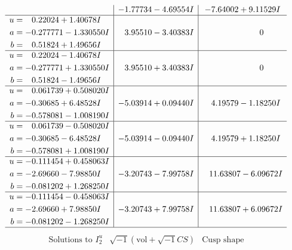 \documentclass[1p]{elsarticle_modified}
\theoremstyle{definition}
\newcommand{\I}{\sqrt{-1}}
\begin{document}
$$\begin{array}{c|c|c}
 & -1.77734 - 4.69554 I & -7.64002 + 9.11529 I \\ \hline\begin{aligned}
u &= \phantom{-}0.22024 + 1.40678 I \\
a &= -0.277771 - 1.330550 I \\
b &= \phantom{-}0.51824 + 1.49656 I\end{aligned}
 & \phantom{-}3.95510 - 3.40383 I & \phantom{-0.000000 } 0 \\ \hline\begin{aligned}
u &= \phantom{-}0.22024 - 1.40678 I \\
a &= -0.277771 + 1.330550 I \\
b &= \phantom{-}0.51824 - 1.49656 I\end{aligned}
 & \phantom{-}3.95510 + 3.40383 I & \phantom{-0.000000 } 0 \\ \hline\begin{aligned}
u &= \phantom{-}0.061739 + 0.508020 I \\
a &= -0.30685 + 6.48528 I \\
b &= -0.578081 - 1.008190 I\end{aligned}
 & -5.03914 + 0.09440 I & \phantom{-}4.19579 - 1.18250 I \\ \hline\begin{aligned}
u &= \phantom{-}0.061739 - 0.508020 I \\
a &= -0.30685 - 6.48528 I \\
b &= -0.578081 + 1.008190 I\end{aligned}
 & -5.03914 - 0.09440 I & \phantom{-}4.19579 + 1.18250 I \\ \hline\begin{aligned}
u &= -0.111454 + 0.458063 I \\
a &= -2.69660 - 7.98850 I \\
b &= -0.081202 + 1.268250 I\end{aligned}
 & -3.20743 - 7.99758 I & \phantom{-}11.63807 - 6.09672 I \\ \hline\begin{aligned}
u &= -0.111454 - 0.458063 I \\
a &= -2.69660 + 7.98850 I \\
b &= -0.081202 - 1.268250 I\end{aligned}
 & -3.20743 + 7.99758 I & \phantom{-}11.63807 + 6.09672 I\\
 \hline 
 \end{array}$$\newpage$$\begin{array}{c|c|c}  
\text{Solutions to }I^u_{2}& \I (\text{vol} + \sqrt{-1}CS) & \text{Cusp shape}\\

\end{array}$$
\end{document}

